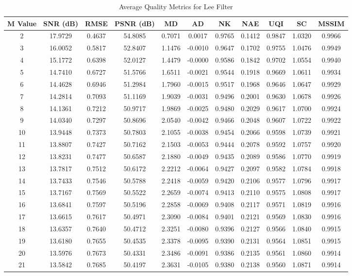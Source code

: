 \begin{table}[htb]
\small
\centering
\begin{tabular}{|c|c|c|c|c|c|c|c|c|c|c|}\hline
M Value & SNR (dB) & RMSE & PSNR (dB) & MD & AD & NK & NAE & UQI & SC & MSSIM \\\hline
2 & 17.9729 & 0.4637 & 54.8085 & 0.7071 & 0.0017 & 0.9765 & 0.1412 & 0.9847 & 1.0320 & 0.9966 \\\hline
3 & 16.0052 & 0.5817 & 52.8407 & 1.1476 & -0.0010 & 0.9647 & 0.1702 & 0.9755 & 1.0476 & 0.9949 \\\hline
4 & 15.1772 & 0.6398 & 52.0127 & 1.4479 & -0.0000 & 0.9586 & 0.1842 & 0.9702 & 1.0554 & 0.9940 \\\hline
5 & 14.7410 & 0.6727 & 51.5766 & 1.6511 & -0.0021 & 0.9544 & 0.1918 & 0.9669 & 1.0611 & 0.9934 \\\hline
6 & 14.4628 & 0.6946 & 51.2984 & 1.7960 & -0.0015 & 0.9517 & 0.1968 & 0.9646 & 1.0647 & 0.9929 \\\hline
7 & 14.2814 & 0.7093 & 51.1169 & 1.9039 & -0.0031 & 0.9496 & 0.2001 & 0.9630 & 1.0678 & 0.9926 \\\hline
8 & 14.1361 & 0.7212 & 50.9717 & 1.9869 & -0.0025 & 0.9480 & 0.2029 & 0.9617 & 1.0700 & 0.9924 \\\hline
9 & 14.0340 & 0.7297 & 50.8696 & 2.0540 & -0.0042 & 0.9466 & 0.2048 & 0.9607 & 1.0722 & 0.9922 \\\hline
10 & 13.9448 & 0.7373 & 50.7803 & 2.1055 & -0.0038 & 0.9454 & 0.2066 & 0.9598 & 1.0739 & 0.9921 \\\hline
11 & 13.8807 & 0.7427 & 50.7162 & 2.1503 & -0.0053 & 0.9444 & 0.2078 & 0.9592 & 1.0757 & 0.9920 \\\hline
12 & 13.8231 & 0.7477 & 50.6587 & 2.1880 & -0.0049 & 0.9435 & 0.2089 & 0.9586 & 1.0770 & 0.9919 \\\hline
13 & 13.7817 & 0.7512 & 50.6172 & 2.2212 & -0.0064 & 0.9427 & 0.2097 & 0.9582 & 1.0784 & 0.9918 \\\hline
14 & 13.7433 & 0.7546 & 50.5788 & 2.2418 & -0.0059 & 0.9420 & 0.2106 & 0.9577 & 1.0796 & 0.9917 \\\hline
15 & 13.7167 & 0.7569 & 50.5522 & 2.2659 & -0.0074 & 0.9413 & 0.2110 & 0.9575 & 1.0808 & 0.9917 \\\hline
16 & 13.6841 & 0.7597 & 50.5196 & 2.2858 & -0.0069 & 0.9408 & 0.2117 & 0.9571 & 1.0819 & 0.9916 \\\hline
17 & 13.6615 & 0.7617 & 50.4971 & 2.3090 & -0.0084 & 0.9401 & 0.2121 & 0.9569 & 1.0830 & 0.9916 \\\hline
18 & 13.6357 & 0.7640 & 50.4712 & 2.3251 & -0.0080 & 0.9396 & 0.2127 & 0.9566 & 1.0840 & 0.9915 \\\hline
19 & 13.6180 & 0.7655 & 50.4535 & 2.3378 & -0.0095 & 0.9390 & 0.2131 & 0.9564 & 1.0851 & 0.9915 \\\hline
20 & 13.5976 & 0.7673 & 50.4331 & 2.3486 & -0.0091 & 0.9386 & 0.2135 & 0.9561 & 1.0860 & 0.9914 \\\hline
21 & 13.5842 & 0.7685 & 50.4197 & 2.3631 & -0.0105 & 0.9380 & 0.2138 & 0.9560 & 1.0871 & 0.9914 \\\hline
\end{tabular}
\caption{Average Quality Metrics for Lee Filter}
\end{table}

